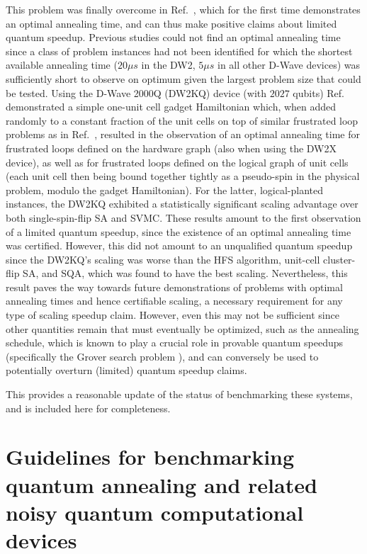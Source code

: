 This problem was finally overcome in Ref.~\cite{Albash:2017aa}, which for the first time demonstrates an optimal annealing time, and can thus make positive claims about limited quantum speedup. Previous studies could not find an optimal annealing time since a class of problem instances had not been identified for which the shortest available annealing time ($20\mu s$ in the DW2, $5\mu s$ in all other D-Wave devices) was sufficiently short to observe on optimum given the largest problem size that could be tested. Using the D-Wave 2000Q (DW2KQ) device (with $2027$ qubits) Ref.~\cite{Albash:2017aa} demonstrated a simple one-unit cell gadget Hamiltonian
which, when added randomly to a constant fraction of the unit cells on top of similar frustrated loop problems as in Ref.~\cite{DW2000Q}, resulted in the observation of an optimal annealing time for frustrated loops defined on the hardware graph (also when using the DW2X device), as well as for frustrated loops defined on the logical graph of unit cells (each unit cell then being bound together tightly as a pseudo-spin in the physical problem, modulo the gadget Hamiltonian). For the latter, logical-planted instances, the DW2KQ exhibited a statistically significant scaling advantage over both single-spin-flip SA and SVMC. These results amount to the first observation of a  limited quantum speedup, since the existence of an optimal annealing time was certified. However, this did not amount to an unqualified quantum speedup since the DW2KQ's scaling was worse than the HFS algorithm, unit-cell cluster-flip SA, and SQA, which was found to have the best scaling. Nevertheless, this result paves the way towards future demonstrations of problems with optimal annealing times and hence certifiable scaling, a necessary requirement for any type of scaling speedup claim. However, even this may not be sufficient since other quantities remain that must eventually be optimized, such as the annealing schedule, which is known to play a crucial role in provable quantum speedups (specifically the Grover search problem \cite{Roland:2002ul,RPL:10}), and can conversely be used to potentially overturn (limited) quantum speedup claims.

This provides a reasonable update of the status of benchmarking these systems, and is included here for completeness.

\section{Guidelines for benchmarking quantum annealing and related noisy quantum computational devices}

